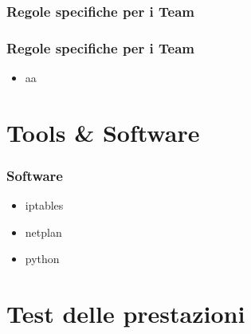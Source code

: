\documentclass{beamer}
\begin{document}
\subsubsection{Regole specifiche per i Team}
\begin{frame}
    \frametitle{Regole specifiche per i Team}
    \begin{itemize}
        \item aa
    \end{itemize}

\end{frame}


\section{Tools \& Software}
\begin{frame}
    \frametitle{Software}
    \begin{itemize}
        \item <1-> iptables
        \item <1-> netplan
        \item <1-> python
    \end{itemize}
     
\end{frame}

\section{Test delle prestazioni}
\begin{frame}
    \frametitle{}

    

\end{frame}
\end{document}
